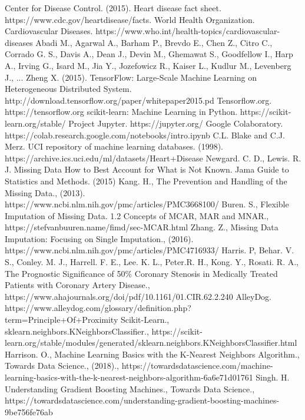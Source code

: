 \documentclass[conference]{IEEEtran}
\begin{document}
\begin{thebibliography}{00}
 Center for Disease Control. (2015). Heart disease fact sheet. https://www.cdc.gov/heartdisease/facts. 
 World Health Organization. Cardiovascular Diseases. https://www.who.int/health-topics/cardiovascular-diseases
 Abadi M., Agarwal A., Barham P., Brevdo E., Chen Z., Citro C., Corrado G. S., Davis A., Dean J., Devin M., Ghemawat S., Goodfellow I., Harp A., Irving G., Isard M., Jia Y., Jozefowicz R., Kaiser L., Kudlur M., Levenberg J., ... Zheng X. (2015). TensorFlow: Large-Scale Machine Learning on Heterogeneous Distributed System. http://download.tensorflow.org/paper/whitepaper2015.pd
 Tensorflow.org. https://tensorflow.org
 scikit-learn: Machine Learning in Python. https://scikit-learn.org/stable/
 Project Jupyter. https://jupyter.org/
 Google Colaboratory. https://colab.research.google.com/notebooks/intro.ipynb
 C.L. Blake and C.J. Merz. UCI repository of machine learning databases. (1998). https://archive.ics.uci.edu/ml/datasets/Heart+Disease
 Newgard. C. D., Lewis. R. J. Missing Data How to Best Account for What is Not Known. Jama Guide to Statistics and Methods. (2015)
 Kang. H., The Prevention and Handling of the Missing Data., (2013). https://www.ncbi.nlm.nih.gov/pmc/articles/PMC3668100/
 Buren. S., Flexible Imputation of Missing Data. 1.2 Concepts of MCAR, MAR and MNAR., https://stefvanbuuren.name/fimd/sec-MCAR.html
 Zhang. Z., Missing Data Imputation: Focusing on Single Imputation., (2016). https://www.ncbi.nlm.nih.gov/pmc/articles/PMC4716933/
 Harris. P, Behar. V. S., Conley. M. J., Harrell. F. E., Lee. K. L., Peter.R. H., Kong. Y., Rosati. R. A., The Prognostic Significance of 50\% Coronary Stenosis in Medically Treated Patients with Coronary Artery Disease., https://www.ahajournals.org/doi/pdf/10.1161/01.CIR.62.2.240
 AlleyDog. https://www.alleydog.com/glossary/definition.php?term=Principle+Of+Proximity
 Scikit-Learn., sklearn.neighbors.KNeighborsClassifier., https://scikit-learn.org/stable/modules/generated/sklearn.neighbors.KNeighborsClassifier.html
 Harrison. O., Machine Learning Basics with the K-Nearest Neighbors Algorithm., Towards Data Science., (2018)., https://towardsdatascience.com/machine-learning-basics-with-the-k-nearest-neighbors-algorithm-6a6e71d01761
 Singh. H. Understanding Gradient Boosting Machines., Towards Data Science., https://towardsdatascience.com/understanding-gradient-boosting-machines-9be756fe76ab

\end{thebibliography}
\end{document}

